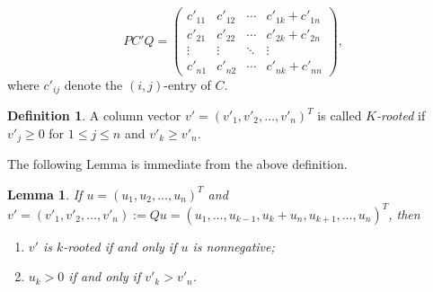 \documentclass[12pt, a4paper]{article}
\theoremstyle{plain}
\newtheorem{lem}[thm]{Lemma}
\theoremstyle{definition}
\newtheorem{defn}[thm]{Definition}
\begin{document}
\begin{equation}\label{PC'Q}
  PC'Q=\begin{pmatrix}
         c'_{11} & c'_{12} & \cdots &  c'_{1k}+c'_{1n} \\
         c'_{21} & c'_{22} & \cdots &  c'_{2k}+c'_{2n} \\
         \vdots & \vdots & \ddots &  \vdots \\
         c'_{n1} & c'_{n2} & \cdots &  c'_{nk}+c'_{nn}
       \end{pmatrix},
\end{equation}
where $c'_{ij}$ denote the $(i,j)$-entry of $C$.






\begin{defn}%
A column vector $v'=(v'_1,v'_2,\ldots,v'_n)^T$ is called {\it $K$-rooted}  if $v'_{j} \geq 0$ for $1 \leq  j \leq n$ and $v'_k\geq v'_n.$
\end{defn}

The following Lemma is immediate from the above definition.%

\begin{lem}\label{lem:rt_vec}
If $u=(u_1, u_2, \ldots, u_n)^T$ and $v'=(v'_1, v'_2, \ldots, v'_n):=Qu=(u_1,\ldots, u_{k-1},u_k+u_n, u_{k+1}, \ldots,  u_n)^T$, then
\begin{enumerate}[label=(\roman*)]
\item \label{lem:rt_vec:en1}$v'$ is $k$-rooted  if and only if $u$ is nonnegative;
\item $u_k>0$ if and only if $v'_k>v'_n$.
\end{enumerate}
\end{lem}
\end{document}
